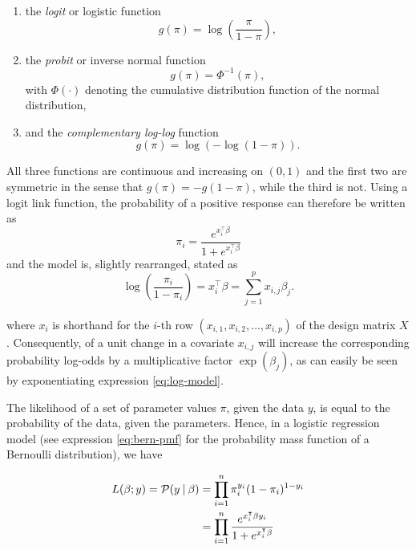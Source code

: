 \begin{enumerate}[label=(\alph*)]
  \item the \textit{logit} or logistic function
  \begin{equation}
    g(\pi) = \log\left(\frac{\pi}{1-\pi}\right),
  \end{equation}
  \item the \textit{probit} or inverse normal function
  \begin{equation}
    g(\pi) = \Phi^{-1}(\pi),
  \end{equation}
  with $\Phi(\cdot)$ denoting the cumulative distribution function of the normal distribution,
  \item and the \textit{complementary log-log} function
  \begin{equation}
    g(\pi) = \log\left(-\log(1-\pi)\right).
  \end{equation}
\end{enumerate}

All three functions are continuous and increasing on $(0,1)$ and the first two are symmetric in the sense that $g(\pi) = -g(1-\pi)$, while the third is not. Using a logit link function, the probability of a positive response can therefore be written as
\begin{equation}
  \pi_i = \frac{e^{x_i^\intercal \beta}}{1+e^{x_i^\intercal \beta}}
\end{equation}
and the model is, slightly rearranged, stated as
\begin{equation}
  \log\left(\frac{\pi_i}{1-\pi_i}\right) = x_i^\intercal \beta = \sum_{j=1}^p x_{i,j}\beta_j.\label{eq:log-model}
\end{equation}

where $x_i$ is shorthand for the $i$-th row $(x_{i,1}, x_{i,2}, \dotsc, x_{i,p})$ of the design matrix $X$. Consequently, of a unit change in a covariate $x_{i,j}$ will increase the corresponding probability log-odds by a multiplicative factor $\exp(\beta_j)$, as can easily be seen by exponentiating expression \ref{eq:log-model}.

The likelihood of a set of parameter values $\pi$, given the data $y$, is equal to the probability of the data, given the parameters. Hence, in a logistic regression model (see expression \ref{eq:bern-pmf} for the probability mass function of a Bernoulli distribution), we have

\begin{subequations}
\begin{align}
  L(\beta; y) = \mathcal{P}(y \:\vert\: \beta) &= \prod_{i=1}^n \pi_i^{y_i} (1-\pi_i)^{1-y_i} \label{eq:lik-any} \\
  &= \prod_{i=1}^n \frac{e^{x_i^\intercal \beta y_i}}{1+e^{x_i^\intercal \beta}} \label{eq:lik-logit}
\end{align}
\end{subequations}

